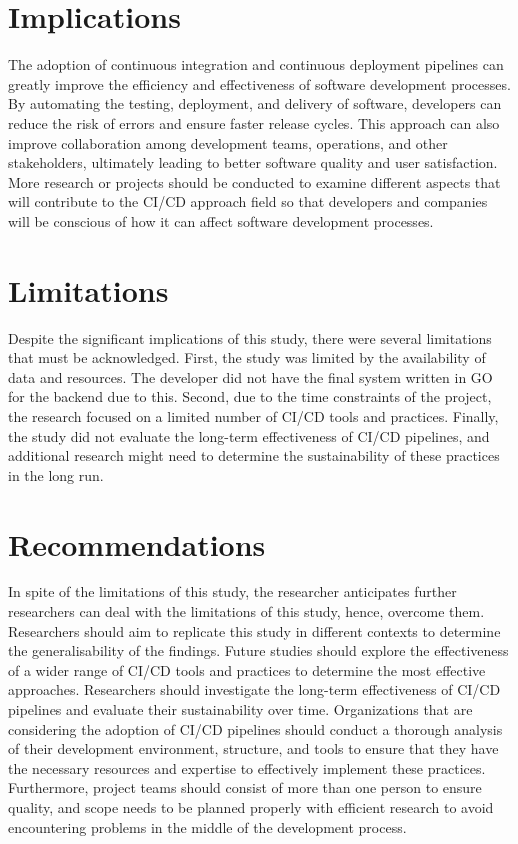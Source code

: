 \section{Implications}
The adoption of continuous integration and continuous deployment pipelines can greatly improve the efficiency and effectiveness of software development processes. By automating the testing, deployment, and delivery of software, developers can reduce the risk of errors and ensure faster release cycles. This approach can also improve collaboration among development teams, operations, and other stakeholders, ultimately leading to better software quality and user satisfaction. More research or projects should be conducted to examine different aspects that will contribute to the CI/CD approach field so that developers and companies will be conscious of how it can affect software development processes.

\section{Limitations}
Despite the significant implications of this study, there were several limitations that must be acknowledged. First, the study was limited by the availability of data and resources. The developer did not have the final system written in GO for the backend due to this. Second, due to the time constraints of the project, the research focused on a limited number of CI/CD tools and practices. Finally, the study did not evaluate the long-term effectiveness of CI/CD pipelines, and additional research might need to determine the sustainability of these practices in the long run.

\section{Recommendations}
In spite of the limitations of this study, the researcher anticipates further researchers can deal with the limitations of this study, hence, overcome them. Researchers should aim to replicate this study in different contexts to determine the generalisability of the findings. Future studies should explore the effectiveness of a wider range of CI/CD tools and practices to determine the most effective approaches. Researchers should investigate the long-term effectiveness of CI/CD pipelines and evaluate their sustainability over time. Organizations that are considering the adoption of CI/CD pipelines should conduct a thorough analysis of their development environment, structure, and tools to ensure that they have the necessary resources and expertise to effectively implement these practices. Furthermore, project teams should consist of more than one person to ensure quality, and scope needs to be planned properly with efficient research to avoid encountering problems in the middle of the development process.